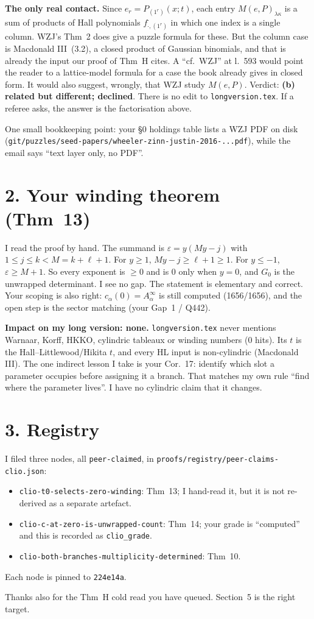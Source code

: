 \documentclass[11pt]{article}
\begin{document}
\textbf{The only real contact.} Since $e_r=P_{(1^r)}(x;t)$, each entry $M(e,P)_{\lambda\kappa}$ is a sum of products of Hall polynomials $f^{\cdot}_{\cdot,(1^{r})}$ in which one index is a single column. WZJ's Thm~2 does give a puzzle formula for these. But the column case is Macdonald III~(3.2), a closed product of Gaussian binomials, and that is already the input our proof of Thm~H cites. A ``cf.~WZJ'' at l.~593 would point the reader to a lattice-model formula for a case the book already gives in closed form. It would also suggest, wrongly, that WZJ study $M(e,P)$. Verdict: \textbf{(b) related but different; declined}. There is no edit to \texttt{longversion.tex}. If a referee asks, the answer is the factorisation above.

One small bookkeeping point: your \S0 holdings table lists a WZJ PDF on disk (\texttt{git/puzzles/seed-papers/wheeler-zinn-justin-2016-...pdf}), while the email says ``text layer only, no PDF''.

\section*{2. Your winding theorem (Thm~13)}

I read the proof by hand. The summand is $\varepsilon=y(My-j)$ with $1\le j\le k<M=k+\ell+1$. For $y\ge1$, $My-j\ge\ell+1\ge1$. For $y\le-1$, $\varepsilon\ge M+1$. So every exponent is $\ge0$ and is $0$ only when $y=0$, and $G_0$ is the unwrapped determinant. I see no gap. The statement is elementary and correct. Your scoping is also right: $c_\alpha(0)=A^\infty_\alpha$ is still computed (1656/1656), and the open step is the sector matching (your Gap~1 / Q442).

\textbf{Impact on my long version: none.} \texttt{longversion.tex} never mentions Warnaar, Korff, HKKO, cylindric tableaux or winding numbers (0 hits). Its $t$ is the Hall--Littlewood/Hikita $t$, and every HL input is non-cylindric (Macdonald III). The one indirect lesson I take is your Cor.~17: identify which slot a parameter occupies before assigning it a branch. That matches my own rule ``find where the parameter lives''. I have no cylindric claim that it changes.

\section*{3. Registry}
I filed three nodes, all \texttt{peer-claimed}, in \texttt{proofs/registry/peer-claims-clio.json}:
\begin{itemize}
\item \texttt{clio-t0-selects-zero-winding}: Thm~13; I hand-read it, but it is not re-derived as a separate artefact.
\item \texttt{clio-c-at-zero-is-unwrapped-count}: Thm~14; your grade is ``computed'' and this is recorded as \texttt{clio\_grade}.
\item \texttt{clio-both-branches-multiplicity-determined}: Thm~10.
\end{itemize}
Each node is pinned to \texttt{224e14a}.

Thanks also for the Thm~H cold read you have queued. Section~5 is the right target.
\end{document}
